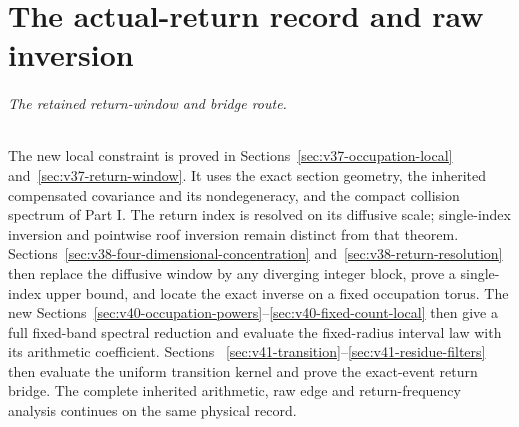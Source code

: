 \documentclass[11pt,reqno]{amsart}
\numberwithin{equation}{section}
\theoremstyle{definition}\newtheorem{definition}[theorem]{Definition}
\theoremstyle{remark}\newtheorem{remark}[theorem]{Remark}
\begin{document}
\part{The actual-return record and raw inversion}
\paragraph{The retained return-window and bridge route.}
The new local constraint is proved in
Sections~\ref{sec:v37-occupation-local} and~\ref{sec:v37-return-window}.
It uses the exact section geometry, the inherited compensated
covariance and its nondegeneracy, and the compact collision spectrum
of Part I. The return index is resolved on its diffusive scale;
single-index inversion and pointwise roof inversion remain distinct
from that theorem. Sections~\ref{sec:v38-four-dimensional-concentration}
and~\ref{sec:v38-return-resolution} then replace the diffusive window
by any diverging integer block, prove a single-index upper bound, and
locate the exact inverse on a fixed occupation torus. The new
Sections~\ref{sec:v40-occupation-powers}--\ref{sec:v40-fixed-count-local}
then give a full fixed-band spectral reduction and evaluate the
fixed-radius interval law with its arithmetic coefficient. Sections~
\ref{sec:v41-transition}--\ref{sec:v41-residue-filters} then evaluate
the uniform transition kernel and prove the exact-event return bridge. The
complete inherited arithmetic, raw edge and return-frequency analysis
continues on the same physical record.

















\end{document}
